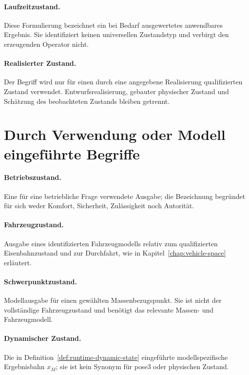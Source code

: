 \paragraph{Laufzeitzustand.}
\label{def:taxonomy-runtime-state}
Diese Formulierung bezeichnet ein bei Bedarf ausgewertetes anwendbares
Ergebnis. Sie identifiziert keinen universellen Zustandstyp und verbirgt den
erzeugenden Operator nicht.

\paragraph{Realisierter Zustand.}
\label{def:taxonomy-realized-state}
Der Begriff wird nur für einen durch eine angegebene Realisierung
qualifizierten Zustand verwendet. Entwurfsrealisierung, gebauter physischer
Zustand und Schätzung des beobachteten Zustands bleiben getrennt.

\section{Durch Verwendung oder Modell eingeführte Begriffe}

\paragraph{Betriebszustand.}
\label{def:taxonomy-operational-state}
Eine für eine betriebliche Frage verwendete Ausgabe; die Bezeichnung begründet
für sich weder Komfort, Sicherheit, Zulässigkeit noch Autorität.

\paragraph{Fahrzeugzustand.}
\label{def:taxonomy-vehicle-state}
Ausgabe eines identifizierten Fahrzeugmodells relativ zum qualifizierten
Eisenbahnzustand und zur Durchfahrt, wie in Kapitel~\ref{chap:vehicle-space}
erläutert.

\paragraph{Schwerpunktzustand.}
\label{def:taxonomy-cg-state}
Modellausgabe für einen gewählten Massenbezugspunkt. Sie ist nicht der
vollständige Fahrzeugzustand und benötigt das relevante Massen- und
Fahrzeugmodell.

\paragraph{Dynamischer Zustand.}
\label{def:taxonomy-dynamic-state}
Die in Definition~\ref{def:runtime-dynamic-state} eingeführte modellspezifische
Ergebnisbahn \(x_M\); sie ist kein Synonym für pose3 oder physischen Zustand.

